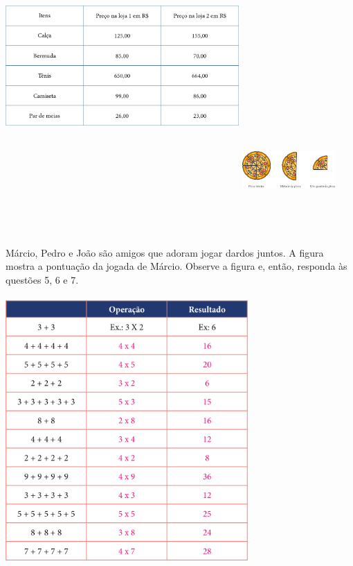 \begin{escolha}
\begin{escolha}
\includegraphics[width=3.51191in,height=5.03125in]{media/image102.png}
\includegraphics[width=1.39487in,height=1.89949in]{media/image103.png}

Márcio, Pedro e João são amigos que adoram jogar dardos juntos. A figura mostra a pontuação da jogada de Márcio. Observe a figura e, então, responda às questões 5, 6 e 7.


\includegraphics[width=3.64583in,height=4.02083in]{media/image104.png}


\end{escolha}
\end{escolha}
